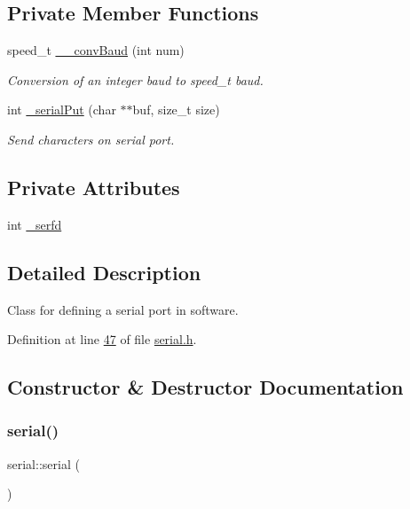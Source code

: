 \subsection*{Private Member Functions}
\begin{DoxyCompactItemize}
\item 
speed\+\_\+t \mbox{\hyperlink{classserial_a3e2ffceef5cd07f53b724da38433a6f0}{\+\_\+\+\_\+conv\+Baud}} (int num)
\begin{DoxyCompactList}\small\item\em Conversion of an integer baud to speed\+\_\+t baud. \end{DoxyCompactList}\item 
int \mbox{\hyperlink{classserial_a4c9d6896cfd99ee1f521bbba7a35cac7}{\+\_\+serial\+Put}} (char $\ast$$\ast$buf, size\+\_\+t size)
\begin{DoxyCompactList}\small\item\em Send characters on serial port. \end{DoxyCompactList}\end{DoxyCompactItemize}
\subsection*{Private Attributes}
\begin{DoxyCompactItemize}
\item 
int \mbox{\hyperlink{classserial_af9528290d0aecf4a4377fbacf3431a17}{\+\_\+serfd}}
\end{DoxyCompactItemize}


\subsection{Detailed Description}
Class for defining a serial port in software. 

Definition at line \mbox{\hyperlink{serial_8h_source_l00047}{47}} of file \mbox{\hyperlink{serial_8h_source}{serial.\+h}}.



\subsection{Constructor \& Destructor Documentation}
\mbox{\label{classserial_af83de4f3ce9a1973df8c4d93358d6d2d}} 
\subsubsection{\texorpdfstring{serial()}{serial()}}
{\footnotesize\ttfamily serial\+::serial (\begin{DoxyParamCaption}{ }\end{DoxyParamCaption})\hspace{0.3cm}{\ttfamily [inline]}}



